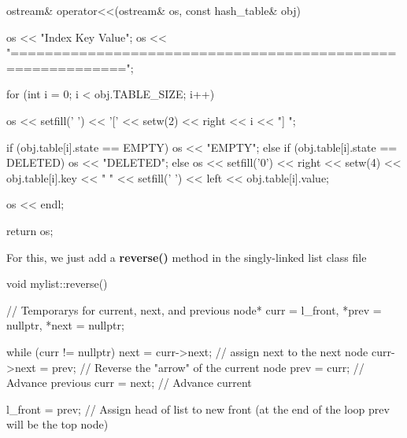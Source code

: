 \documentclass{report}
\begin{document}
    \pagebreak 
    \begin{cppcode}
        ostream& operator<<(ostream& os, const hash_table& obj)
        {
            os << "Index  Key    Value\n";
            os << "===========================================================\n";

            for (int i = 0; i < obj.TABLE_SIZE; i++)
            {
                os << setfill(' ') << '[' << setw(2) << right << i << "]   ";

                if (obj.table[i].state == EMPTY)
                os << "EMPTY";
                else if (obj.table[i].state == DELETED)
                os << "DELETED";
                else
                os << setfill('0') << right << setw(4) << obj.table[i].key
                << "   " << setfill(' ') << left << obj.table[i].value;

                os << endl;
            }

            return os;
        }

    \end{cppcode}

    \pagebreak 
    \bigbreak \noindent 
    For this, we just add a \textbf{reverse()} method in the singly-linked list class file 
    \bigbreak \noindent 
    \begin{cppcode}
        void mylist::reverse()
        {
            // Temporarys for current, next, and previous
            node* curr = l_front, *prev = nullptr, *next = nullptr;

            while (curr != nullptr) {
                next = curr->next; // assign next to the next node
                curr->next = prev; // Reverse the "arrow" of the current node
                prev = curr; // Advance previous
                curr = next; // Advance current
            }

            l_front = prev; // Assign head of list to new front (at the end of the loop prev will be the top node)
        }
    \end{cppcode}
\end{document}
